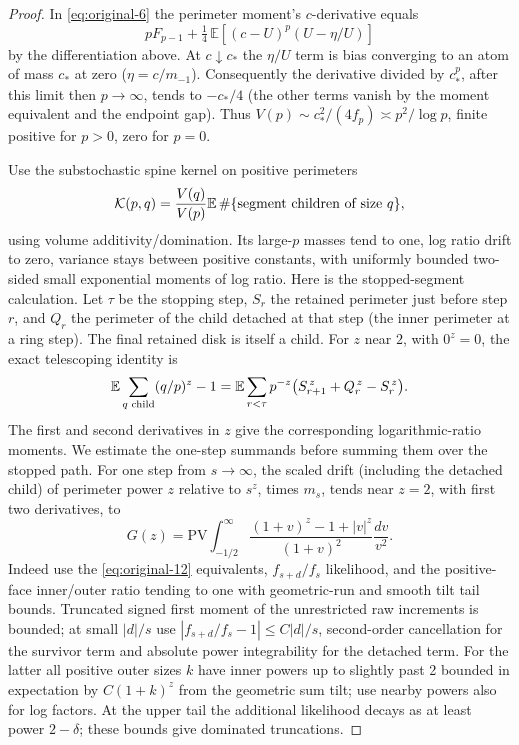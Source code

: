 \begin{proof}

In \eqref{eq:original-6} the perimeter moment's \(c\)-derivative equals \[
 p F_{p-1}+\tfrac14\,\mathbb E[(c-U)^p(U-\eta/U)]
\] by the differentiation above. At \(c\downarrow c_*\) the \(\eta/U\) term is bias
converging to an atom of mass \(c_*\) at zero (\(\eta=c/m_{-1}\)). Consequently the
derivative divided by \(c_*^p\), after this limit then \(p\to\infty\), tends to \(-c_*/4\)
(the other terms vanish by the moment equivalent and the endpoint gap). Thus
\(V(p)\sim c_*^2/(4 f_p)\asymp p^2/\log p\), finite positive for \(p>0\), zero for
\(p=0\).

Use the substochastic spine kernel on positive perimeters \[
             {\cal K}(p,q)=\frac{V(q)}{V(p)}
                    \mathbb E\,\#\{\text{segment children of size }q\},
\] using volume additivity/domination. Its large-\(p\) masses tend to one, log ratio drift
to zero, variance stays between positive constants, with uniformly bounded two-sided small
exponential moments of log ratio. Here is the stopped-segment calculation. Let $\tau$ be the stopping
step, $S_r$ the retained perimeter just before step $r$, and $Q_r$ the
perimeter of the child detached at that step (the inner perimeter at a
ring step). The final retained disk is itself a child. For $z$ near $2$,
with $0^z=0$, the exact telescoping identity is
\[
 \mathbb E\sum_{q\text{ child}}(q/p)^z-1
 =\mathbb E\sum_{r<\tau}p^{-z}
       \bigl(S_{r+1}^{\,z}+Q_r^{\,z}-S_r^{\,z}\bigr).
\]
The first and second derivatives in $z$ give the corresponding
logarithmic-ratio moments. We estimate the one-step summands before
summing them over the stopped path. For one step from
\(s\to\infty\), the scaled drift (including the detached child) of perimeter power \(z\)
relative to \(s^z\), times \(m_s\), tends near \(z=2\), with first two derivatives, to \[
       G(z)=\mathrm{PV}\int_{-1/2}^{\infty}
       \frac{(1+v)^z-1+|v|^z}{(1+v)^2}\frac{dv}{v^2}.
\] Indeed use the \eqref{eq:original-12} equivalents, \(f_{s+d}/f_s\) likelihood, and the
positive-face inner/outer ratio tending to one with geometric-run and smooth tilt tail
bounds. Truncated signed first moment of the unrestricted raw increments is bounded; at
small \(|d|/s\) use \(|f_{s+d}/f_s-1|\le C|d|/s\), second-order cancellation for the
survivor term and absolute power integrability for the detached term. For the latter all
positive outer sizes \(k\) have inner powers up to slightly past 2 bounded in expectation
by \(C(1+k)^z\) from the geometric sum tilt; use nearby powers also for log factors. At
the upper tail the additional likelihood decays as at least power \(2-\delta\); these
bounds give dominated truncations. 


\end{proof}
